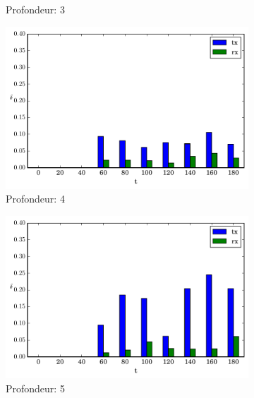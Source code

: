 \begin{figure}[h]
\begin{subfigure}{0.3\textwidth}
    \caption{Profondeur: 3}
    \label{supervision:fig:noinfo_3}
  \end{subfigure}

  \begin{subfigure}{0.3\textwidth}
    \includegraphics[width=\textwidth]{img/evolution_noinfo_4.pdf}
    \caption{Profondeur: 4}
    \label{supervision:fig:noinfo_4}
  \end{subfigure}
  \begin{subfigure}{0.3\textwidth}
    \includegraphics[width=\textwidth]{img/evolution_noinfo_5.pdf}
    \caption{Profondeur: 5}
    \label{supervision:fig:noinfo_5}
  \end{subfigure}
  \begin{subfigure}{0.3\textwidth}

\end{subfigure}
\end{figure}
